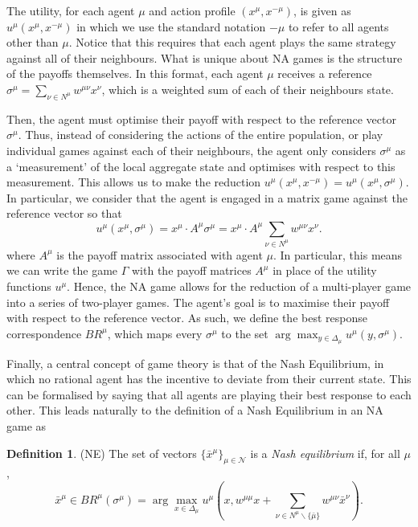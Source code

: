 \documentclass{article}
\theoremstyle{definition}
\newtheorem{definition}{Definition}
\newcommand{\agentset}{\mathcal{N}}
\newcommand{\utility}[1]{u^{#1}}
\newcommand{\wmunu}{w^{\mu \nu}}
\newcommand{\xmu}{x^{\mu}}
\newcommand{\xnu}{x^{\nu}}
\newcommand{\refmu}{\sigma^{\mu}}
\newcommand{\NE}[1]{\bar{x}^{#1}}
\newcommand{\weightedsum}{ \sum_{\nu \in N^\mu} \wmunu \xnu}
\newcommand{\xnotmu}{x^{-\mu}}
\begin{document}
The utility, for each agent $\mu$ and action profile
$(\xmu, \xnotmu)$, is given as $u^\mu(\xmu, \xnotmu)$ in which we
use the standard notation $-\mu$ to refer to all agents other than
$\mu$. Notice that this requires that each agent plays the same
strategy against all of their neighbours. What is unique about 
NA games is the structure of the payoffs themselves. In this format,
each agent $\mu$ receives a reference $\sigma^{\mu} = \sum_{\nu \in N^\mu} \wmunu \xnu$, which is a weighted sum
of each of their neighbours state.
%

Then, the agent must optimise their payoff with respect to the
reference vector $\sigma^{\mu}$. Thus, instead of considering
the actions of the entire population, or play individual games
against each of their neighbours, the agent only considers
$\sigma^\mu$ as a `measurement' of the local aggregate state and
optimises with respect to this measurement.  This allows us to make
the reduction $u^\mu(\xmu, \xnotmu) = u^\mu(\xmu, \refmu)$. In
particular, we consider that the agent is engaged in a matrix game
against the reference vector so that
%
\begin{equation}
	u^\mu(\xmu, \refmu) = \xmu \cdot A^\mu \refmu = \xmu
	\cdot A^\mu \weightedsum.
\end{equation}
%
where $A^\mu$ is the payoff matrix associated with agent $\mu$. In particular,  this means we can write the game $\Gamma$ with the payoff
matrices $A^\mu$ in place of the utility functions
$\utility{\mu}$. Hence, the NA game allows for the reduction of a
multi-player game into a series of two-player games. The agent's goal
is to maximise their payoff with respect to the reference vector. As
such, we define the best response correspondence $BR^\mu$, which maps
every $\refmu$ to the set $\arg \max_{y \in \Delta_\mu} {u^\mu(y,
	\refmu)}$.

Finally, a central concept of game theory is that of the Nash
Equilibrium, in which no rational agent has the incentive to deviate
from their current state. This can be formalised by saying that all
agents are playing their best response to each other.
%
This leads naturally to the definition of a Nash Equilibrium in an NA game as
%
\begin{definition}(NE) \label{def::NE}
	The set of vectors $\{ \NE{\mu}\}_{\mu \in \agentset}$ is a {\em
		Nash equilibrium} if, for all $\mu$,
	\begin{equation*}
		\NE{\mu} \in BR^\mu (\refmu) = \arg \max_{x \in \Delta_\mu} u^\mu(x, w^{\mu \mu} x + \sum_{\nu \in N^\mu \backslash \{\bar{\mu}\}} \wmunu \NE{\nu}).
	\end{equation*} 
\end{definition}
\end{document}
